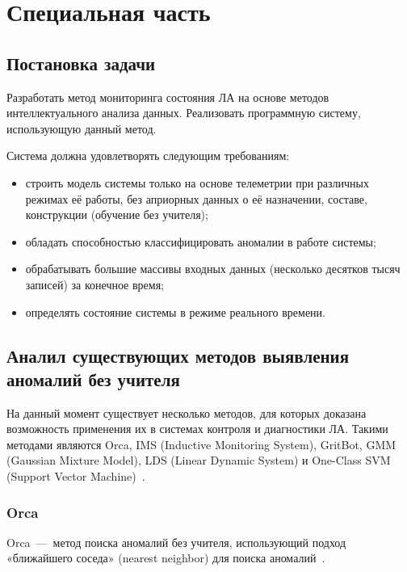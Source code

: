 \chapter{Специальная часть}
\section{Постановка задачи}
Разработать метод мониторинга состояния ЛА на основе методов интеллектуального анализа данных. Реализовать программную систему, использующую данный метод.

Система должна удовлетворять следующим требованиям:
\begin{itemize}
	\item строить модель системы только на основе телеметрии при различных режимах её работы, без априорных данных о её назначении, составе, конструкции (обучение без учителя);
	\item обладать способностью классифицировать аномалии в работе системы;
	\item обрабатывать большие массивы входных данных (несколько десятков тысяч записей) за конечное время;
	\item определять состояние системы в режиме реального времени.
\end{itemize}

\section{Аналил существующих методов выявления аномалий без учителя}
На данный момент существует несколько методов, для которых доказана возможность применения их в системах контроля и диагностики ЛА. Такими методами являются Orca, IMS (Inductive Monitoring System), GritBot, GMM (Gaussian Mixture Model), LDS (Linear Dynamic System) и One-Class SVM (Support Vector Machine)~\cite{MartinCompUnsupervisedDetectionMethods}.

\subsection{Orca}
Orca~---~метод поиска аномалий без учителя, использующий подход «ближайшего соседа» (nearest neighbor) для поиска аномалий~\cite{SchwabacherMachLearnAppl}.